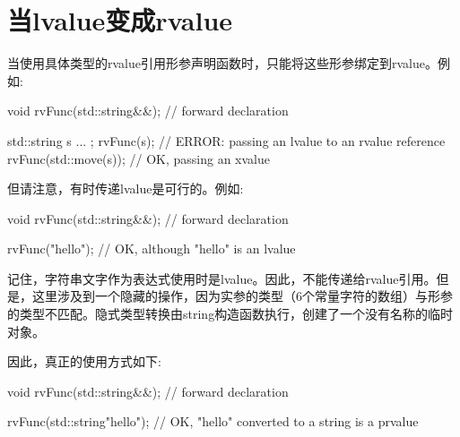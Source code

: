\section{当lvalue变成rvalue}
当使用具体类型的rvalue引用形参声明函数时，只能将这些形参绑定到rvalue。例如:

\begin{cppcode}
void rvFunc(std::string&&); // forward declaration

std::string s{ ... };
rvFunc(s); // ERROR: passing an lvalue to an rvalue reference
rvFunc(std::move(s)); // OK, passing an xvalue
\end{cppcode}

但请注意，有时传递lvalue是可行的。例如:

\begin{cppcode}
void rvFunc(std::string&&); // forward declaration

rvFunc("hello"); // OK, although "hello" is an lvalue
\end{cppcode}

记住，字符串文字作为表达式使用时是lvalue。因此，不能传递给rvalue引用。但是，这里涉及到一个隐藏的操作，因为实参的类型（6个常量字符的数组）与形参的类型不匹配。隐式类型转换由string构造函数执行，创建了一个没有名称的临时对象。

因此，真正的使用方式如下:

\begin{cppcode}
void rvFunc(std::string&&); // forward declaration

rvFunc(std::string{"hello"}); // OK, "hello" converted to a string is a prvalue
\end{cppcode}






























































